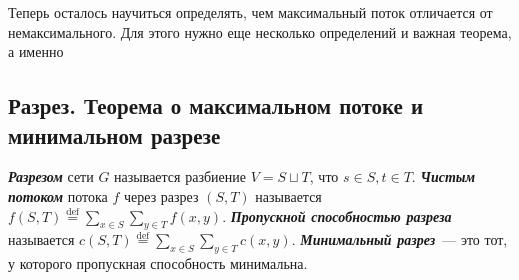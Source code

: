 Теперь осталось научиться определять, чем максимальный поток отличается от немаксимального. Для этого нужно еще несколько определений и важная теорема, а именно
\subsection{Разрез. Теорема о максимальном потоке и минимальном разрезе}
\begin{definition}
	{\bf\it Разрезом} сети $G$ называется разбиение $V=S\sqcup T$, что $s\in S,t\in T$.
	{\bf\it Чистым потоком} потока $f$ через разрез $(S,T)$ называется $f(S,T)\overset{\mathrm{def}}{=}\sum_{x\in S}\sum_{y\in T}f(x,y)$. 
	{\bf\it Пропускной способностью разреза} называется $c(S,T)\overset{\mathrm{def}}{=}\sum_{x\in S}\sum_{y\in T}c(x,y)$.
	{\bf\it Минимальный разрез}~--- это тот, у которого пропускная способность минимальна.
\end{definition}

